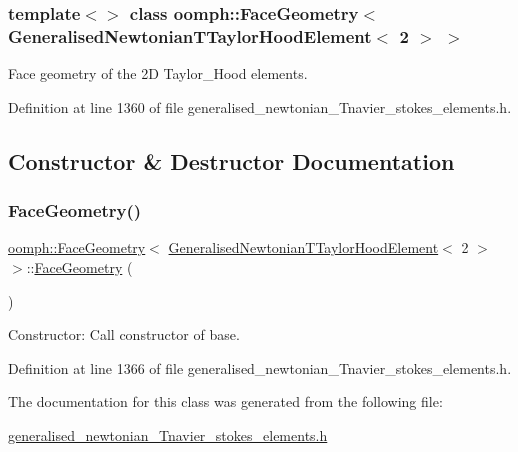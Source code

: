 \subsubsection*{template$<$$>$\newline
class oomph\+::\+Face\+Geometry$<$ Generalised\+Newtonian\+T\+Taylor\+Hood\+Element$<$ 2 $>$ $>$}

Face geometry of the 2D Taylor\+\_\+\+Hood elements. 

Definition at line 1360 of file generalised\+\_\+newtonian\+\_\+\+Tnavier\+\_\+stokes\+\_\+elements.\+h.



\subsection{Constructor \& Destructor Documentation}
\mbox{\label{classoomph_1_1FaceGeometry_3_01GeneralisedNewtonianTTaylorHoodElement_3_012_01_4_01_4_ad7a767ffe9c9d06b239ce7416285bffe}} 
\subsubsection{\texorpdfstring{Face\+Geometry()}{FaceGeometry()}}
{\footnotesize\ttfamily \hyperlink{classoomph_1_1FaceGeometry}{oomph\+::\+Face\+Geometry}$<$ \hyperlink{classoomph_1_1GeneralisedNewtonianTTaylorHoodElement}{Generalised\+Newtonian\+T\+Taylor\+Hood\+Element}$<$ 2 $>$ $>$\+::\hyperlink{classoomph_1_1FaceGeometry}{Face\+Geometry} (\begin{DoxyParamCaption}{ }\end{DoxyParamCaption})\hspace{0.3cm}{\ttfamily [inline]}}



Constructor\+: Call constructor of base. 



Definition at line 1366 of file generalised\+\_\+newtonian\+\_\+\+Tnavier\+\_\+stokes\+\_\+elements.\+h.



The documentation for this class was generated from the following file\+:\begin{DoxyCompactItemize}
\item 
\hyperlink{generalised__newtonian__Tnavier__stokes__elements_8h}{generalised\+\_\+newtonian\+\_\+\+Tnavier\+\_\+stokes\+\_\+elements.\+h}\end{DoxyCompactItemize}
